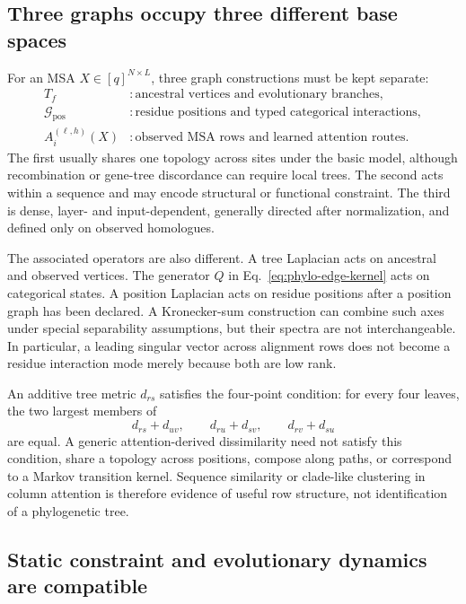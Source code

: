 \documentclass[10pt]{article}
\theoremstyle{definition}
\theoremstyle{remark}
\newcommand{\BookSection}[1]{\subsection{#1}}
\begin{document}
\BookSection{Three graphs occupy three different base spaces}

For an MSA $X\in[q]^{N\times L}$, three graph constructions must be kept separate:
\begin{equation}
\boxed{
\begin{aligned}
T_f &: \text{ancestral vertices and evolutionary branches},\\
\mathcal G_{\mathrm{pos}} &: \text{residue positions and typed categorical interactions},\\
A_i^{(\ell,h)}(X) &: \text{observed MSA rows and learned attention routes}.
\end{aligned}}
\label{eq:three-phylogeny-graphs}
\end{equation}
The first usually shares one topology across sites under the basic model, although recombination
or gene-tree discordance can require local trees.  The second acts within a sequence and may encode
structural or functional constraint.  The third is dense, layer- and input-dependent, generally
directed after normalization, and defined only on observed homologues.

The associated operators are also different.  A tree Laplacian acts on ancestral and observed
vertices.  The generator $Q$ in Eq.~\ref{eq:phylo-edge-kernel} acts on categorical states.  A
position Laplacian acts on residue positions after a position graph has been declared.  A
Kronecker-sum construction can combine such axes under special separability assumptions, but their
spectra are not interchangeable.  In particular, a leading singular vector across alignment rows
does not become a residue interaction mode merely because both are low rank.

An additive tree metric $d_{rs}$ satisfies the four-point condition: for every four leaves, the two
largest members of
\begin{equation}
d_{rs}+d_{uv},\qquad d_{ru}+d_{sv},\qquad d_{rv}+d_{su}
\label{eq:four-point-condition}
\end{equation}
are equal.  A generic attention-derived dissimilarity need not satisfy this condition, share a
topology across positions, compose along paths, or correspond to a Markov transition kernel.
Sequence similarity or clade-like clustering in column attention is therefore evidence of useful
row structure, not identification of a phylogenetic tree.

\BookSection{Static constraint and evolutionary dynamics are compatible}
\end{document}
